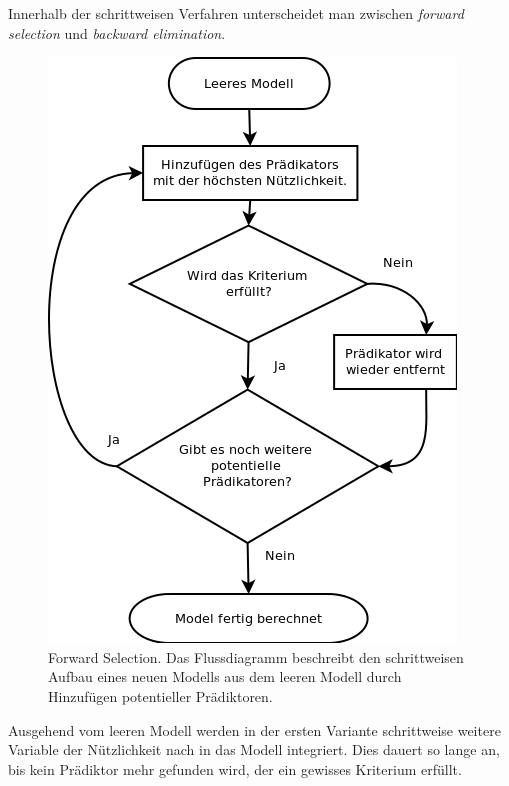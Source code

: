 Innerhalb der schrittweisen Verfahren unterscheidet man zwischen \textit{forward selection} und \textit{backward elimination}. 
\begin{figure}[H]
	\centering
	\includegraphics[height=0.5\textheight]{forward_stepwise.png}
	\caption{Forward Selection. Das Flussdiagramm beschreibt den schrittweisen Aufbau eines neuen Modells aus dem leeren Modell durch Hinzufügen potentieller Prädiktoren.}
	\label{fig:forward_stepwise}
\end{figure}
Ausgehend vom leeren Modell werden in der ersten Variante schrittweise weitere Variable der Nützlichkeit nach in das Modell integriert. Dies dauert so lange an, bis kein Prädiktor mehr gefunden wird, der ein gewisses Kriterium erfüllt.
